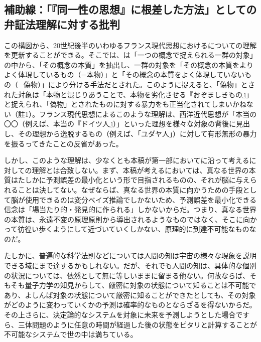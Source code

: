 \subsection{補助線：「『同一性の思想』に根差した方法」としての弁証法理解に対する批判}\label{ux88dcux52a9ux7ddaux540cux4e00ux6027ux306eux601dux60f3ux306bux6839ux5deeux3057ux305fux65b9ux6cd5ux3068ux3057ux3066ux306eux5f01ux8a3cux6cd5ux7406ux89e3ux306bux5bfeux3059ux308bux6279ux5224}

この構図から、20世紀後半のいわゆるフランス現代思想におけるについての理解を更新することができる。そこでは、は「一つの概念で捉えられる一群の対象」の中から、「その概念の本質」を抽出し、一群の対象を「その概念の本質をよりよく体現しているもの（=本物）」と「その概念の本質をよく体現していないもの（=偽物）」により分ける手法だとされた。このように捉えると、「偽物」とされた対象は「本物と混じりあうことで、本物を劣化させる『おぞましきもの』」と捉えられ、「偽物」とされたものに対する暴力をも正当化されてしまいかねない（註1）。フランス現代思想によるこのような理解は、西洋近代思想が「本当の〇〇（例えば、本当の『ドイツ人』）」といった理想を様々な対象の背後に見出し、その理想から逸脱するもの（例えば、「ユダヤ人」）に対して有形無形の暴力を振るってきたことの反省があった。

しかし、このような理解は、少なくとも本稿が第一部においてに沿って考えるに対しての理解とは合致しない。まず、本稿が考えるにおいては、真なる世界の本質はたしかに予測誤差の最小化という形で目指されるものの、それが脳に与えられることは決してない。なぜならば、真なる世界の本質に向かうための手段として脳が使用できるのは変分ベイズ推論でしかないため、予測誤差を最小化できる信念は「場当たり的・発見的に作られる」しかないからだ。つまり、真なる世界の本質は、永遠不変の原理原則から導出されるようなものではなく、そこに向かって彷徨い歩くようにして近づいていくしかない、原理的に到達不可能なものなのだ。

たしかに、普遍的な科学法則などについては人間の知は宇宙の様々な現象を説明できる域にまで達するかもしれない。だが、それでも人間の知は、具体的な個別の状況については、依然として無に等しいままに留まる他ない。何故ならば、そもそも量子力学の知見からして、厳密に対象の状態について知ることは不可能であり、よしんば対象の状態について厳密に知ることができたとしても、その対象がどのように変わっていくかの予測は確率的なものとならざるを得ないからだ。その上さらに、決定論的なシステムを対象に未来を予測しようとした場合ですら、三体問題のように任意の時間が経過した後の状態をピタリと計算することが不可能なシステムで世の中は満ちている。

